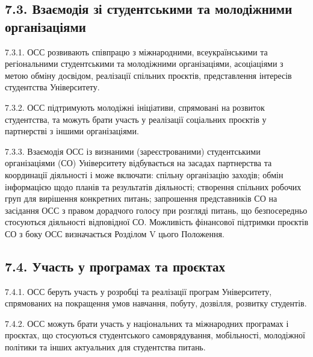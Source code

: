 \subsection*{7.3. Взаємодія зі студентськими та молодіжними організаціями}
    7.3.1. ОСС розвивають співпрацю з міжнародними, всеукраїнськими та регіональними студентськими та молодіжними організаціями, асоціаціями з метою обміну досвідом, реалізації спільних проєктів, представлення інтересів студентства Університету.

    7.3.2. ОСС підтримують молодіжні ініціативи, спрямовані на розвиток студентства, та можуть брати участь у реалізації соціальних проєктів у партнерстві з іншими організаціями.

    7.3.3. Взаємодія ОСС із визнаними (зареєстрованими) студентськими організаціями (СО) Університету відбувається на засадах партнерства та координації діяльності і може включати: спільну організацію заходів; обмін інформацією щодо планів та результатів діяльності; створення спільних робочих груп для вирішення конкретних питань; запрошення представників СО на засідання ОСС з правом дорадчого голосу при розгляді питань, що безпосередньо стосуються діяльності відповідної СО. Можливість фінансової підтримки проєктів СО з боку ОСС визначається Розділом V цього Положення.

\subsection*{7.4. Участь у програмах та проєктах}
    7.4.1. ОСС беруть участь у розробці та реалізації програм Університету, спрямованих на покращення умов навчання, побуту, дозвілля, розвитку студентів.

    7.4.2. ОСС можуть брати участь у національних та міжнародних програмах і проєктах, що стосуються студентського самоврядування, мобільності, молодіжної політики та інших актуальних для студентства питань.
